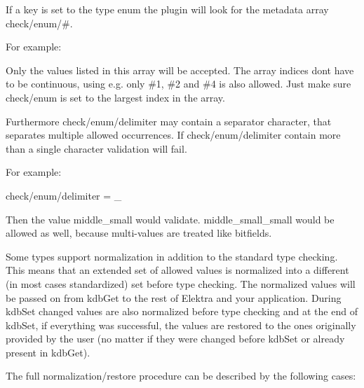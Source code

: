 If a key is set to the type {\ttfamily enum} the plugin will look for the metadata array {\ttfamily check/enum/\#}.

For example\+:




Only the values listed in this array will be accepted. The array indices don\textquotesingle{}t have to be continuous, using e.\+g. only {\ttfamily \#1}, {\ttfamily \#2} and {\ttfamily \#4} is also allowed. Just make sure {\ttfamily check/enum} is set to the largest index in the array.

Furthermore {\ttfamily check/enum/delimiter} may contain a separator character, that separates multiple allowed occurrences. If {\ttfamily check/enum/delimiter} contain more than a single character validation will fail.

For example\+:


\begin{DoxyCode}
check/enum/delimiter = \_
\end{DoxyCode}


Then the value {\ttfamily middle\+\_\+small} would validate. {\ttfamily middle\+\_\+small\+\_\+small} would be allowed as well, because multi-\/values are treated like bitfields.

Some types support normalization in addition to the standard type checking. This means that an extended set of allowed values is normalized into a different (in most cases standardized) set before type checking. The normalized values will be passed on from {\ttfamily kdb\+Get} to the rest of Elektra and your application. During {\ttfamily kdb\+Set} changed values are also normalized before type checking and at the end of {\ttfamily kdb\+Set}, if everything was successful, the values are restored to the ones originally provided by the user (no matter if they were changed before {\ttfamily kdb\+Set} or already present in {\ttfamily kdb\+Get}).

The full normalization/restore procedure can be described by the following cases\+:


